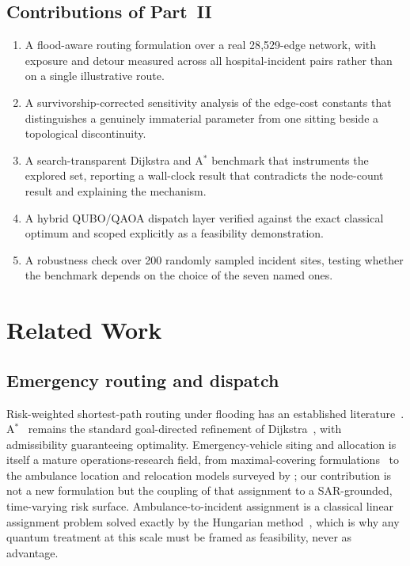 \documentclass[journal]{IEEEtran}
\begin{document}
\subsection{Contributions of Part~II}
\begin{enumerate}
\item A flood-aware routing formulation over a real 28{,}529-edge network,
      with exposure and detour measured across all hospital-incident pairs
      rather than on a single illustrative route.
\item A survivorship-corrected sensitivity analysis of the edge-cost constants
      that distinguishes a genuinely immaterial parameter from one sitting
      beside a topological discontinuity.
\item A search-transparent Dijkstra and A$^\ast$ benchmark that instruments the
      explored set, reporting a wall-clock result that contradicts the
      node-count result and explaining the mechanism.
\item A hybrid QUBO/QAOA dispatch layer verified against the exact classical
      optimum and scoped explicitly as a feasibility demonstration.
\item A robustness check over 200 randomly sampled incident sites, testing
      whether the benchmark depends on the choice of the seven named ones.
\end{enumerate}
\section{Related Work}
\subsection{Emergency routing and dispatch}
Risk-weighted shortest-path routing under flooding has an established
literature~\citep{zhang2019,yin2016}. A$^\ast$~\citep{hart1968} remains the
standard goal-directed refinement of Dijkstra~\citep{dijkstra1959}, with
admissibility guaranteeing optimality. Emergency-vehicle siting and allocation is
itself a mature operations-research field, from maximal-covering
formulations~\citep{church1974} to the ambulance location and relocation models
surveyed by \citet{brotcorne2003}; our contribution is not a new formulation but
the coupling of that assignment to a SAR-grounded, time-varying risk surface.
Ambulance-to-incident assignment is a classical linear assignment problem solved
exactly by the Hungarian method~\citep{kuhn1955}, which is why any quantum
treatment at this scale must be framed as feasibility, never as advantage.
\end{document}
